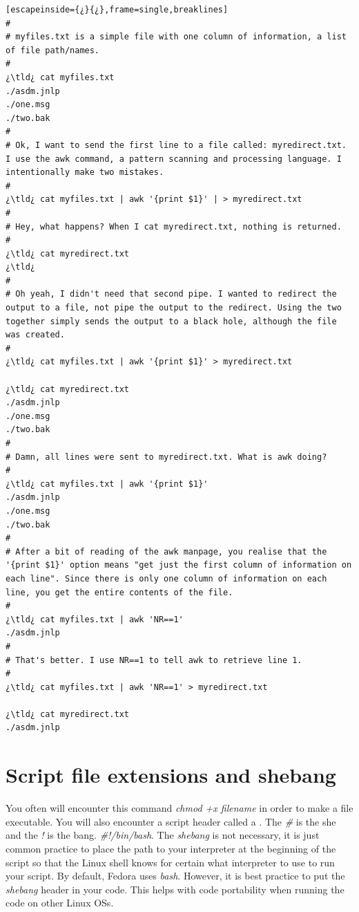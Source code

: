 \begin{lstlisting}[escapeinside={¿}{¿},frame=single,breaklines]
#
# myfiles.txt is a simple file with one column of information, a list of file path/names.
#
¿\tld¿ cat myfiles.txt
./asdm.jnlp
./one.msg
./two.bak
#
# Ok, I want to send the first line to a file called: myredirect.txt. I use the awk command, a pattern scanning and processing language. I intentionally make two mistakes.
#
¿\tld¿ cat myfiles.txt | awk '{print $1}' | > myredirect.txt
#
# Hey, what happens? When I cat myredirect.txt, nothing is returned.
#
¿\tld¿ cat myredirect.txt
¿\tld¿
#
# Oh yeah, I didn't need that second pipe. I wanted to redirect the output to a file, not pipe the output to the redirect. Using the two together simply sends the output to a black hole, although the file was created.
#
¿\tld¿ cat myfiles.txt | awk '{print $1}' > myredirect.txt

¿\tld¿ cat myredirect.txt
./asdm.jnlp
./one.msg
./two.bak
#
# Damn, all lines were sent to myredirect.txt. What is awk doing?
#
¿\tld¿ cat myfiles.txt | awk '{print $1}'
./asdm.jnlp
./one.msg
./two.bak
#
# After a bit of reading of the awk manpage, you realise that the '{print $1}' option means "get just the first column of information on each line". Since there is only one column of information on each line, you get the entire contents of the file.
#
¿\tld¿ cat myfiles.txt | awk 'NR==1'
./asdm.jnlp
#
# That's better. I use NR==1 to tell awk to retrieve line 1.
#
¿\tld¿ cat myfiles.txt | awk 'NR==1' > myredirect.txt

¿\tld¿ cat myredirect.txt
./asdm.jnlp
\end{lstlisting}

\section{Script file extensions and shebang}

You often will encounter this command \emph{chmod +x filename} in order to make a file executable. You will also encounter a script header called a . The \emph{\#} is the she and the \emph{!} is the bang. \textsl{\#!/bin/bash}. The \emph{shebang} is not necessary, it is just common practice to place the path to your interpreter at the beginning of the script so that the Linux shell knows for certain what interpreter to use to run your script. By default, Fedora uses \emph{bash}. However, it is best practice to put the \emph{shebang} header in your code. This helps with code portability when running the code on other Linux OSs.

